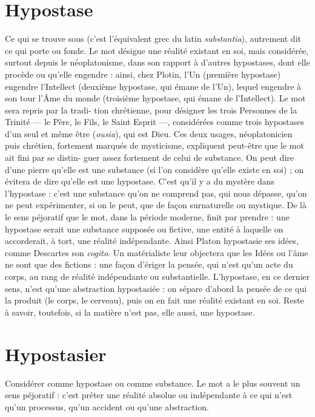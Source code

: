 \section{Hypostase}
Ce qui se trouve sous (c’est l'équivalent grec du latin {\it substantia}),
autrement dit ce qui porte ou fonde. Le mot désigne
une réalité existant en soi, mais considérée, surtout depuis le néoplatonisme,
dans son rapport à d’autres hypostases, dont elle procède ou qu’elle engendre :
ainsi, chez Plotin, l’Un (première hypostase) engendre l’Intellect (deuxième
hypostase, qui émane de l’Un), lequel engendre à son tour l'Âme du monde
(troisième hypostase, qui émane de l’Intellect). Le mot sera repris par la tradi-
tion chrétienne, pour désigner les trois Personnes de la Trinité — le Père, le Fils,
le Saint Esprit —, considérées comme trois hypostases d’un seul et même être
({\it ousia}), qui est Dieu. Ces deux usages, néoplatonicien puis chrétien, fortement
marqués de mysticisme, expliquent peut-être que le mot ait fini par se distin-
guer assez fortement de celui de substance. On peut dire d’une pierre qu’elle est
une substance (si l’on considère qu’elle existe en soi) ; on évitera de dire qu’elle
est une hypostase. C’est qu’il y a du mystère dans l’hypostase : c’est une substance
qu'on ne comprend pas, qui nous dépasse, qu’on ne peut expérimenter,
si on le peut, que de façon surnaturelle ou mystique. De là le sens péjoratif que
le mot, dans la période moderne, finit par prendre : une hypostase serait une
substance supposée ou fictive, une entité à laquelle on accorderait, à tort, une
réalité indépendante. Ainsi Platon hypostasie ses idées, comme Descartes son
{\it cogito}. Un matérialiste leur objectera que les Idées ou l’âme ne sont que des
fictions : une façon d’ériger la pensée, qui n’est qu’un acte du corps, au rang de
réalité indépendante ou substantielle. L’hypostase, en ce dernier sens, n’est
qu'une abstraction hypostasiée : on sépare d’abord la pensée de ce qui la produit
(le corps, le cerveau), puis on en fait une réalité existant en soi. Reste à
savoir, toutefois, si la matière n’est pas, elle aussi, une hypostase.

\section{Hypostasier}
Considérer comme hypostase ou comme substance. Le
mot a le plus souvent un sens péjoratif : c’est prêter une
réalité absolue ou indépendante à ce qui n’est qu’un processus, qu’un accident
ou qu’une abstraction.

